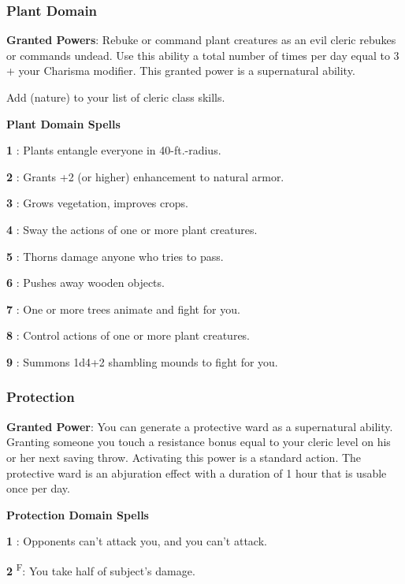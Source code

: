 \subsubsection{Plant Domain}

\textbf{Granted Powers}: Rebuke or command plant creatures as an evil cleric rebukes or commands undead. Use this ability a total number of times per day equal to 3 + your Charisma modifier. This granted power is a supernatural ability.

Add  (nature) to your list of cleric class skills.

\textbf{Plant Domain Spells}

\textbf{1} : Plants entangle everyone in 40-ft.-radius.

\textbf{2} : Grants +2 (or higher) enhancement to natural armor.

\textbf{3} : Grows vegetation, improves crops.

\textbf{4} : Sway the actions of one or more plant creatures.

\textbf{5} : Thorns damage anyone who tries to pass.

\textbf{6} : Pushes away wooden objects.

\textbf{7} : One or more trees animate and fight for you.

\textbf{8} : Control actions of one or more plant creatures.

\textbf{9} : Summons 1d4+2 shambling mounds to fight for you.

\subsubsection{Protection}

\textbf{Granted Power}: You can generate a protective ward as a supernatural ability. Granting someone you touch a resistance bonus equal to your cleric level on his or her next saving throw. Activating this power is a standard action. The protective ward is an abjuration effect with a duration of 1 hour that is usable once per day.

\textbf{Protection Domain Spells}

\textbf{1} : Opponents can't attack you, and you can't attack.

\textbf{2} \textsuperscript{F}: You take half of subject's damage.

